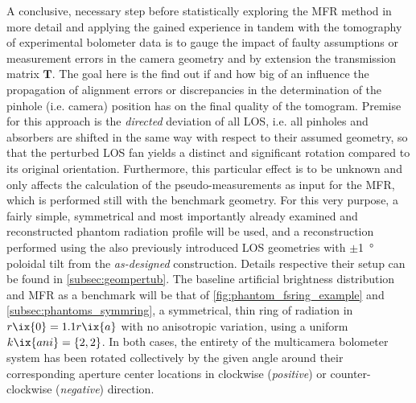             A conclusive, necessary step before statistically exploring the MFR method in more detail and applying the gained experience in tandem with the tomography of experimental bolometer data is to gauge the impact of faulty assumptions or measurement errors in the camera geometry and by extension the transmission matrix $\mathbf{T}$. The goal here is the find out if and how big of an influence the propagation of alignment errors or discrepancies in the determination of the pinhole (i.e. camera) position has on the final quality of the tomogram. Premise for this approach is the \textit{directed} deviation of all LOS, i.e. all pinholes and absorbers are shifted in the same way with respect to their assumed geometry, so that the perturbed LOS fan yields a distinct and significant rotation compared to its original orientation. Furthermore, this particular effect is to be unknown and only affects the calculation of the pseudo-measurements as input for the MFR, which is performed still with the benchmark geometry. For this very purpose, a fairly simple, symmetrical and most importantly already examined and reconstructed phantom radiation profile will be used, and a reconstruction performed using the also previously introduced LOS geometries with $\pm$\SI{1}{\degree} poloidal tilt from the \textit{as-designed} construction. Details respective their setup can be found in \cref{subsec:geompertub}. The baseline artificial brightness distribution and MFR as a benchmark will be that of \cref{fig:phantom_fsring_example} and \cref{subsec:phantoms_symmring}, a symmetrical, thin ring of radiation in $r\ix{0}=1.1r\ix{a}$ with no anisotropic variation, using a uniform $k\ix{ani}=\left\{2, 2\right\}$. In both cases, the entirety of the multicamera bolometer system has been rotated collectively by the given angle around their corresponding aperture center locations in clockwise (\textit{positive}) or counter-clockwise (\textit{negative}) direction.\\%
